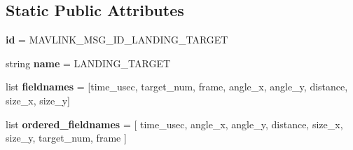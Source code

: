 \subsection*{Static Public Attributes}
\begin{DoxyCompactItemize}
\item 
\mbox{\label{classpymavlink_1_1dialects_1_1v10_1_1MAVLink__landing__target__message_a8d014304205e9bcb42050938b8cb3647}} 
{\bfseries id} = M\+A\+V\+L\+I\+N\+K\+\_\+\+M\+S\+G\+\_\+\+I\+D\+\_\+\+L\+A\+N\+D\+I\+N\+G\+\_\+\+T\+A\+R\+G\+ET
\item 
\mbox{\label{classpymavlink_1_1dialects_1_1v10_1_1MAVLink__landing__target__message_a58b7d29b7e1a56089f1acb25cf6b0b8d}} 
string {\bfseries name} = \textquotesingle{}L\+A\+N\+D\+I\+N\+G\+\_\+\+T\+A\+R\+G\+ET\textquotesingle{}
\item 
\mbox{\label{classpymavlink_1_1dialects_1_1v10_1_1MAVLink__landing__target__message_a7f465d46520a35e3a3bd91c824423d7a}} 
list {\bfseries fieldnames} = \mbox{[}\textquotesingle{}time\+\_\+usec\textquotesingle{}, \textquotesingle{}target\+\_\+num\textquotesingle{}, \textquotesingle{}frame\textquotesingle{}, \textquotesingle{}angle\+\_\+x\textquotesingle{}, \textquotesingle{}angle\+\_\+y\textquotesingle{}, \textquotesingle{}distance\textquotesingle{}, \textquotesingle{}size\+\_\+x\textquotesingle{}, \textquotesingle{}size\+\_\+y\textquotesingle{}\mbox{]}
\item 
\mbox{\label{classpymavlink_1_1dialects_1_1v10_1_1MAVLink__landing__target__message_adb23c565bd05dc45dc2ff6d84c6d9563}} 
list {\bfseries ordered\+\_\+fieldnames} = \mbox{[} \textquotesingle{}time\+\_\+usec\textquotesingle{}, \textquotesingle{}angle\+\_\+x\textquotesingle{}, \textquotesingle{}angle\+\_\+y\textquotesingle{}, \textquotesingle{}distance\textquotesingle{}, \textquotesingle{}size\+\_\+x\textquotesingle{}, \textquotesingle{}size\+\_\+y\textquotesingle{}, \textquotesingle{}target\+\_\+num\textquotesingle{}, \textquotesingle{}frame\textquotesingle{} \mbox{]}
\item 
\mbox{\label{classpymavlink_1_1dialects_1_1v10_1_1MAVLink__landing__target__message_a6b851af3f46515662bc8ca005adfc895}} 

\end{DoxyCompactItemize}

